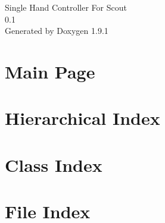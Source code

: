 \let\mypdfximage\pdfximage\def\pdfximage{\immediate\mypdfximage}\documentclass[twoside]{book}
\newcommand{\+}{\discretionary{\mbox{\scriptsize$\hookleftarrow$}}{}{}}
\newcommand{\clearemptydoublepage}{%
  \newpage{\pagestyle{empty}\cleardoublepage}%
}
\begin{document}
\raggedbottom

\hypersetup{pageanchor=false,
             bookmarksnumbered=true,
             pdfencoding=unicode
            }
\begin{titlepage}
\vspace*{7cm}
\begin{center}%
{\Large Single Hand Controller For Scout \\[1ex]\large 0.\+1 }\\
\vspace*{1cm}
{\large Generated by Doxygen 1.9.1}\\
\end{center}
\end{titlepage}
\clearemptydoublepage
{}
\tableofcontents
\clearemptydoublepage
{}
\hypersetup{pageanchor=true}

\chapter{Main Page}
\label{index}\hypertarget{index}{}
\chapter{Hierarchical Index}

\chapter{Class Index}

\chapter{File Index}

\end{document}
